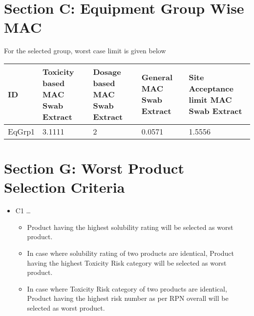 \documentclass{article}
\begin{document}
        \section{Section C: Equipment Group Wise MAC}
        For the selected group, worst case limit is given below
        \begin{longtable}[l]{|p{1.5cm} |p{3cm} |p{3cm} |p{3cm} |p{3cm} |}
        
ID&Toxicity based MAC Swab Extract&Dosage based MAC Swab Extract&General MAC Swab Extract &Site Acceptance limit MAC Swab Extract\\
\hline

EqGrp1&3.1111&2&0.0571&1.5556\\
\hline

        \end{longtable}
        \newpage
        \section{Section G: Worst Product Selection Criteria}
        \begin{itemize}\item C1 \dots{}\begin{itemize}\item Product having the highest solubility rating will be selected as worst product.\item In case where solubility rating of two products are identical, Product having the highest Toxicity Risk category will be selected as worst product.\item In case where Toxicity Risk category of two products are identical, Product having the highest risk number as per RPN overall will be selected as worst product.\end{itemize}\end{itemize}
        \newpage
\end{document}

